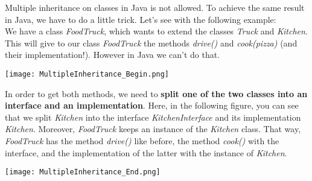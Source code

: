 Multiple inheritance on classes in Java is not allowed. To achieve the same result in Java, we have to do a little trick. Let’s see with the following example:\\
We have a class \textit{FoodTruck}, which wants to extend the classes \textit{Truck} and \textit{Kitchen}. This will give to our class \textit{FoodTruck} the methods \textit{drive()} and \textit{cook(pizza)} (and their implementation!). However in Java we can’t do that.\\
\begin{center}
\texttt{[image: MultipleInheritance\_Begin.png]}
\end{center}
In order to get both methods, we need to\textbf{ split one of the two classes into an interface and an implementation}. Here, in the following figure, you can see that we split \textit{Kitchen} into the interface \textit{KitchenInterface} and its implementation \textit{Kitchen}. Moreover, \textit{FoodTruck} keeps an instance of the \textit{Kitchen} class. That way, \textit{FoodTruck} has the method \textit{drive()} like before, the method \textit{cook()} with the interface, and the implementation of the latter with the instance of \textit{Kitchen}.\\
\begin{center}
\texttt{[image: MultipleInheritance\_End.png]}
\end{center}